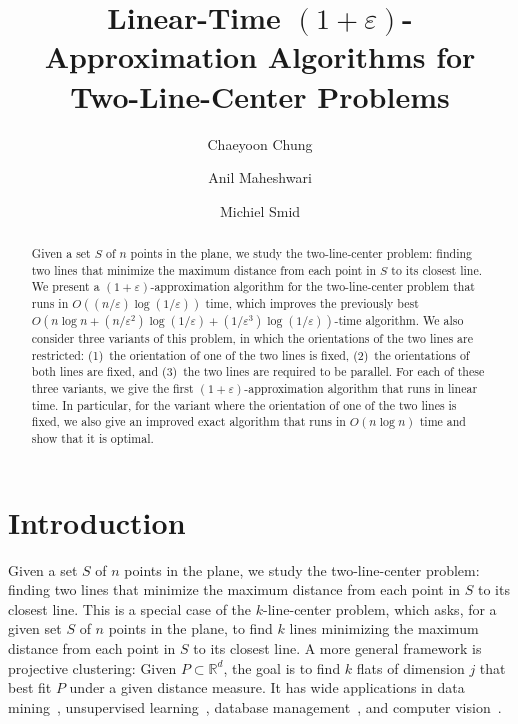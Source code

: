 \documentclass[english,a4paper, cleveref, autoref, thm-restate, nolineno]{socg-lipics-v2021}
\title{Linear-Time \texorpdfstring{$(1+\varepsilon)$-}{}Approximation Algorithms for Two-Line-Center Problems} %
\author{Chaeyoon Chung}{Department of Computer Science and Engineering, Pohang University of Science and Technology, Pohang, South Korea.}{chaeyoon17@postech.ac.kr}{https://orcid.org/0009-0008-3363-2406}{}%
\author{Anil Maheshwari}{School of Computer Science, Carleton University, Ottawa, Canada.}{anil@scs.carleton.ca}{https://orcid.org/0000-0002-1274-4598}{}
\author{Michiel Smid}{School of Computer Science, Carleton University, Ottawa, Canada.}{anil@scs.carleton.ca}{https://orcid.org/0000-0003-3683-9054}{}
\theoremstyle{star}
\theoremstyle{claimstar}
\newcommand{\eps}{\ensuremath{\varepsilon}}
\begin{document}
\maketitle


\begin{abstract}
Given a set $S$ of $n$ points in the plane, we study the two-line-center problem: finding two lines that minimize the maximum distance from each point in $S$ to its closest line.
We present a $(1+\eps)$-approximation algorithm for the two-line-center problem that runs in $O((n/\eps) \log (1/\eps))$ time, which improves the  previously best $O(n\log n + ({n}/{\eps^2}) \log ({1}/{\eps}) + (1/\eps^3)\log ({1}/{\eps}))$-time algorithm. 
We also consider three variants of this problem, in which the orientations of the two lines are restricted: (1)~the orientation of one of the two lines is fixed,
(2)~the orientations of both lines are fixed, and
(3)~the two lines are required to be parallel.
For each of these three variants, we give the first $(1+\eps)$-approximation algorithm that runs in linear time.
In particular, for the variant where the orientation of one of the two lines is fixed, we also give an improved exact algorithm that runs in $O(n \log n)$ time and show that it is optimal.
\end{abstract}


\section{Introduction}


Given a set $S$ of $n$ points in the plane, we study the two-line-center problem: finding two lines that minimize the maximum distance from each point in $S$ to its closest line.  
This is a special case of the $k$-line-center problem, which asks, for a given set $S$ of $n$ points in the plane, to find $k$ lines minimizing the maximum distance from each point in $S$ to its closest line.  
A more general framework is projective clustering: Given $P\subset \mathbb R^d$, the goal is to find $k$ flats of dimension $j$ that best fit $P$ under a given distance measure. 
It has wide applications in data mining~\cite{datamining1999, datamining2000}, unsupervised learning~\cite{Procopiuc2010unsupervised}, database management~\cite{Chakrabarti2000db}, and computer vision~\cite{Procopiuc2002cv}.  
\end{document}
